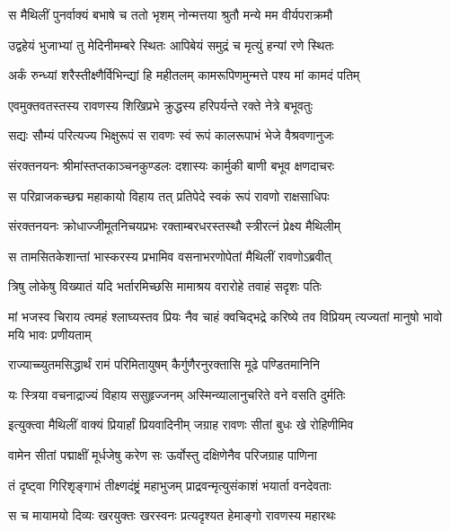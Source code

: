 \twolineshloka
{स मैथिलीं पुनर्वाक्यं बभाषे च ततो भृशम्}
{नोन्मत्तया श्रुतौ मन्ये मम वीर्यपराक्रमौ} %

\twolineshloka
{उद्वहेयं भुजाभ्यां तु मेदिनीमम्बरे स्थितः}
{आपिबेयं समुद्रं च मृत्युं हन्यां रणे स्थितः} %

\twolineshloka
{अर्कं रुन्ध्यां शरैस्तीक्ष्णैर्विभिन्द्यां हि महीतलम्}
{कामरूपिणमुन्मत्ते पश्य मां कामदं पतिम्} %

\twolineshloka
{एवमुक्तवतस्तस्य रावणस्य शिखिप्रभे}
{क्रुद्धस्य हरिपर्यन्ते रक्ते नेत्रे बभूवतुः} %

\twolineshloka
{सद्यः सौम्यं परित्यज्य भिक्षुरूपं स रावणः}
{स्वं रूपं कालरूपाभं भेजे वैश्रवणानुजः} %

\twolineshloka
{संरक्तनयनः श्रीमांस्तप्तकाञ्चनकुण्डलः}
{दशास्यः कार्मुकी बाणी बभूव क्षणदाचरः} %

\twolineshloka
{स परिव्राजकच्छद्म महाकायो विहाय तत्}
{प्रतिपेदे स्वकं रूपं रावणो राक्षसाधिपः} %

\twolineshloka
{संरक्तनयनः क्रोधाज्जीमूतनिचयप्रभः}
{रक्ताम्बरधरस्तस्थौ स्त्रीरत्नं प्रेक्ष्य मैथिलीम्} %

\twolineshloka
{स तामसितकेशान्तां भास्करस्य प्रभामिव}
{वसनाभरणोपेतां मैथिलीं रावणोऽब्रवीत्} %

\twolineshloka
{त्रिषु लोकेषु विख्यातं यदि भर्तारमिच्छसि}
{मामाश्रय वरारोहे तवाहं सदृशः पतिः} %

\threelineshloka
{मां भजस्व चिराय त्वमहं श्लाघ्यस्तव प्रियः}
{नैव चाहं क्वचिद्भद्रे करिष्ये तव विप्रियम्}
{त्यज्यतां मानुषो भावो मयि भावः प्रणीयताम्} %

\twolineshloka
{राज्याच्च्युतमसिद्धार्थं रामं परिमितायुषम्}
{कैर्गुणैरनुरक्तासि मूढे पण्डितमानिनि} %

\twolineshloka
{यः स्त्रिया वचनाद्राज्यं विहाय ससुहृज्जनम्}
{अस्मिन्व्यालानुचरिते वने वसति दुर्मतिः} %

\twolineshloka
{इत्युक्त्वा मैथिलीं वाक्यं प्रियार्हां प्रियवादिनीम्}
{जग्राह रावणः सीतां बुधः खे रोहिणीमिव} %

\twolineshloka
{वामेन सीतां पद्माक्षीं मूर्धजेषु करेण सः}
{ऊर्वोस्तु दक्षिणेनैव परिजग्राह पाणिना} %

\twolineshloka
{तं दृष्ट्वा गिरिशृङ्गाभं तीक्ष्णदंष्ट्रं महाभुजम्}
{प्राद्रवन्मृत्युसंकाशं भयार्ता वनदेवताः} %

\twolineshloka
{स च मायामयो दिव्यः खरयुक्तः खरस्वनः}
{प्रत्यदृश्यत हेमाङ्गो रावणस्य महारथः} %

